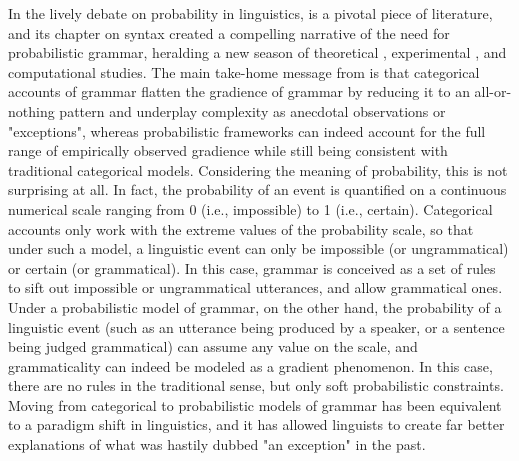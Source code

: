 In the lively debate on probability in linguistics, \textcite{bod2003probabilistic} is a pivotal piece of literature, and its chapter on syntax \parencite{manning2003probabilistic} created a compelling narrative of the need for probabilistic grammar, heralding a new season of theoretical \parencite{wasow2007gradient, CrockerKeller2006, Sprouse2018}, experimental \parencite{KellerSorace2003, bresnan2007probabilistic, BresnanHay2008, BresnanNikitina2008, SoraceKeller2005, AlexopoulouKeller2006, Sprouse2015, BrehmGoldrick2017}, and computational \parencite{TurneyPantel2010} studies. The main take-home message from \textcite{manning2003probabilistic} is that categorical accounts of grammar flatten the gradience of grammar by reducing it to an all-or-nothing pattern and underplay complexity as anecdotal observations or "exceptions", whereas probabilistic frameworks can indeed account for the full range of empirically observed gradience while still being consistent with traditional categorical models. Considering the meaning of probability, this is not surprising at all. In fact, the probability of an event is quantified on a continuous numerical scale ranging from 0 (i.e., impossible) to 1 (i.e., certain). Categorical accounts only work with the extreme values of the probability scale, so that under such a model, a linguistic event can only be impossible (or ungrammatical) or certain (or grammatical). In this case, grammar is conceived as a set of rules to sift out impossible or ungrammatical utterances, and allow grammatical ones. Under a probabilistic model of grammar, on the other hand, the probability of a linguistic event (such as an utterance being produced by a speaker, or a sentence being judged grammatical) can assume any value on the scale, and grammaticality can indeed be modeled as a gradient phenomenon. In this case, there are no rules in the traditional sense, but only soft probabilistic constraints. Moving from categorical to probabilistic models of grammar has been equivalent to a paradigm shift in linguistics, and it has allowed linguists to create far better explanations of what was hastily dubbed "an exception" in the past.\\

